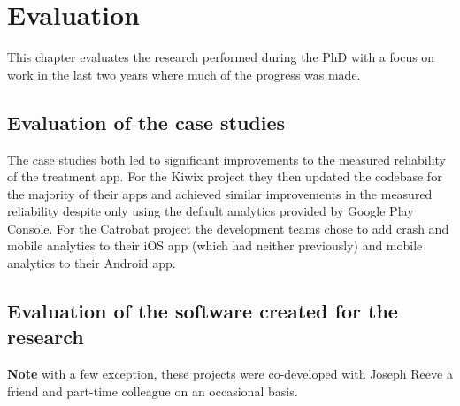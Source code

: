 \chapter{Evaluation}
This chapter evaluates the research performed during the PhD with a focus on work in the last two years where much of the progress was made. 

\section{Evaluation of the case studies}
The case studies both led to significant improvements to the measured reliability of the treatment app. For the Kiwix project they then updated the codebase for the majority of their apps and achieved similar improvements in the measured reliability despite only using the default analytics provided by Google Play Console. For the Catrobat project the development teams chose to add crash and mobile analytics to their iOS app (which had neither previously) and mobile analytics to their Android app.

\section{Evaluation of the software created for the research}
\textbf{Note} with a few exception, these projects were co-developed with Joseph Reeve a friend and part-time colleague on an occasional basis.

